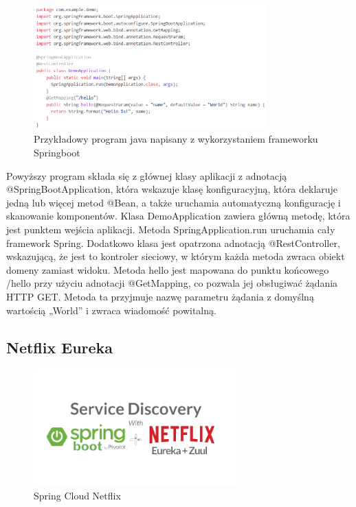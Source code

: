 \begin{figure}[!h]
    \centering
    \includegraphics[width=0.8\textwidth]{images/springboot/exampleJavaSpringBootProgram.png}
    \caption{Przykładowy program java napisany z wykorzystaniem frameworku Springboot\cite{springJavaExampleProgram}}
    \label{fig:enter-label}
\end{figure}

Powyższy program składa się z głównej klasy aplikacji z adnotacją @SpringBootApplication, która wskazuje klasę konfiguracyjną, która deklaruje jedną lub więcej metod @Bean, a także uruchamia automatyczną konfigurację i skanowanie komponentów. Klasa DemoApplication zawiera główną metodę, która jest punktem wejścia aplikacji. Metoda SpringApplication.run uruchamia cały framework Spring.
Dodatkowo klasa jest opatrzona adnotacją @RestController, wskazującą, że jest to kontroler sieciowy, w którym każda metoda zwraca obiekt domeny zamiast widoku. Metoda hello jest mapowana do punktu końcowego /hello przy użyciu adnotacji @GetMapping, co pozwala jej obsługiwać żądania HTTP GET. Metoda ta przyjmuje nazwę parametru żądania z domyślną wartością „World” i zwraca wiadomość powitalną.

\subsection{Netflix Eureka}

\begin{figure}[!htbp]
    \centering
    \includegraphics[width=0.7\textwidth]{images/netflixEureka/netflixEurekaLogo.png}
    \caption{Spring Cloud Netflix\cite{netflixEurekaMedium}}
    \label{fig:enter-label}
\end{figure}

